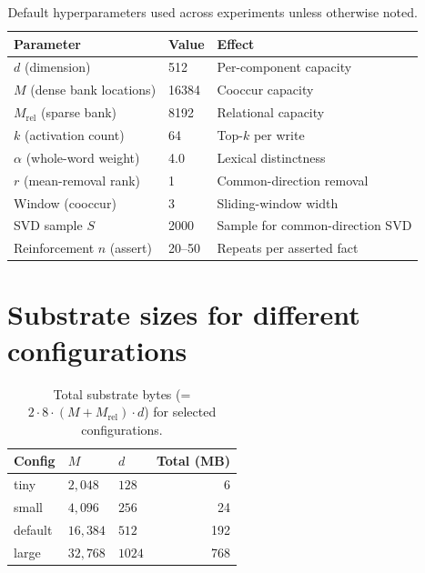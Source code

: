 \documentclass[11pt,a4paper]{article}
\begin{document}
\begin{table}[h]
  \centering
  \caption{Default hyperparameters used across experiments unless
  otherwise noted.}
  \begin{tabular}{lll}
    \toprule
    Parameter & Value & Effect \\
    \midrule
    $d$ (dimension)              & 512    & Per-component capacity \\
    $M$ (dense bank locations)   & 16384  & Cooccur capacity \\
    $M_{\mathrm{rel}}$ (sparse bank) & 8192 & Relational capacity \\
    $k$ (activation count)       & 64     & Top-$k$ per write \\
    $\alpha$ (whole-word weight) & 4.0    & Lexical distinctness \\
    $r$ (mean-removal rank)      & 1      & Common-direction removal \\
    Window (cooccur)             & 3      & Sliding-window width \\
    SVD sample $S$               & 2000   & Sample for common-direction SVD \\
    Reinforcement $n$ (assert)   & 20--50 & Repeats per asserted fact \\
    \bottomrule
  \end{tabular}
\end{table}

\section{Substrate sizes for different configurations}

\begin{table}[h]
  \centering
  \caption{Total substrate bytes (= $2 \cdot 8 \cdot (M + M_{\mathrm{rel}}) \cdot d$)
  for selected configurations.}
  \begin{tabular}{lllr}
    \toprule
    Config & $M$ & $d$ & Total (MB) \\
    \midrule
    tiny     & $2{,}048$ & $128$  & 6  \\
    small    & $4{,}096$ & $256$  & 24 \\
    default  & $16{,}384$ & $512$ & 192 \\
    large    & $32{,}768$ & $1024$ & 768 \\
    \bottomrule
  \end{tabular}
\end{table}
\end{document}
